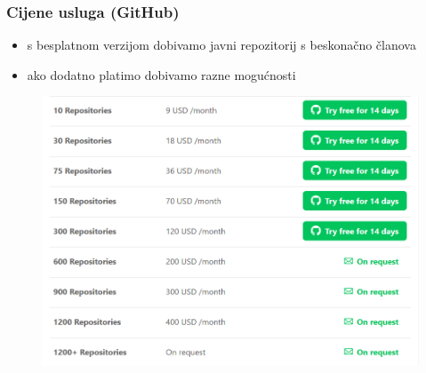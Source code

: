 \documentclass[12p, Times New Roman]{beamer}
\begin{document}
	\begin{frame}				%
		\frametitle{Cijene usluga (GitHub)}

		\begin{itemize}
			\item s besplatnom verzijom dobivamo javni repozitorij s beskonačno članova
			\item ako dodatno platimo dobivamo razne mogućnosti

		\end{itemize}

		\begin{figure}
			\begin{center}
				\includegraphics[scale=0.38]{priceg.PNG}
			\end{center}
		\end{figure}

	\end{frame}                           
\end{document}
